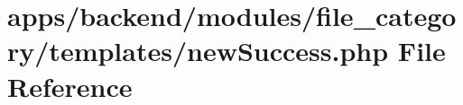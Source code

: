 \hypertarget{backend_2modules_2file__category_2templates_2new_success_8php}{\section{apps/backend/modules/file\-\_\-category/templates/new\-Success.php File Reference}
\label{backend_2modules_2file__category_2templates_2new_success_8php}
}

